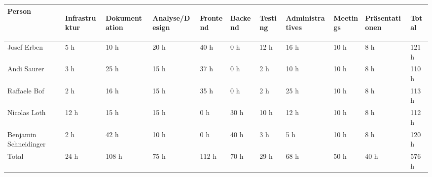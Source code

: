 \begin{longtabu} to \textwidth { | X[l] | l | l | l | l | l | l | l | l | l | l | }
\hline
\textbf{Person} & \begin{turn}{90}\textbf{Infrastruktur}\end{turn} & \begin{turn}{90}\textbf{Dokumentation}\end{turn} & \begin{turn}{90}\textbf{Analyse/Design}\end{turn} & \begin{turn}{90}\textbf{Frontend}\end{turn} & \begin{turn}{90}\textbf{Backend}\end{turn} & \begin{turn}{90}\textbf{Testing}\end{turn} & \begin{turn}{90}\textbf{Administratives}\end{turn} & \begin{turn}{90}\textbf{Meetings}\end{turn} & \begin{turn}{90}\textbf{Präsentationen}\end{turn} & \begin{turn}{90}\textbf{Total}\end{turn} \\\hline
\endhead

Josef Erben &	5 h &	10 h &	20 h &	40 h &	0 h &	12 h &	16 h &	10 h &	8 h &	121 h \\\hline
Andi Saurer &	3 h &	25 h &	15 h &	37 h &	0 h &	2 h &	10 h &	10 h &	8 h &	110 h \\\hline
Raffaele Bof &	2 h &	16 h &	15 h &	35 h &	0 h &	2 h &	25 h &	10 h &	8 h &	113 h \\\hline
Nicolas Loth &	12 h &	15 h &	15 h &	0 h &	30 h &	10 h &	12 h &	10 h &	8 h &	112 h \\\hline
Benjamin Schneidinger &	2 h &	42 h &	10 h &	0 h &	40 h &	3 h &	5 h &	10 h &	8 h &	120 h \\\hline
Total &	24 h &	108 h &	75 h &	112 h &	70 h &	29 h &	68 h &	50 h &	40 h &	576 h \\\hline

\end{longtabu}

